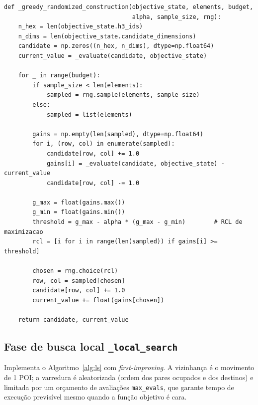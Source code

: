\documentclass[11pt,a4paper]{article}
\begin{document}
\begin{lstlisting}[style=py,caption={Construção gulosa-aleatória com RCL amostrada.}]
def _greedy_randomized_construction(objective_state, elements, budget,
                                    alpha, sample_size, rng):
    n_hex = len(objective_state.h3_ids)
    n_dims = len(objective_state.candidate_dimensions)
    candidate = np.zeros((n_hex, n_dims), dtype=np.float64)
    current_value = _evaluate(candidate, objective_state)

    for _ in range(budget):
        if sample_size < len(elements):
            sampled = rng.sample(elements, sample_size)
        else:
            sampled = list(elements)

        gains = np.empty(len(sampled), dtype=np.float64)
        for i, (row, col) in enumerate(sampled):
            candidate[row, col] += 1.0
            gains[i] = _evaluate(candidate, objective_state) - current_value
            candidate[row, col] -= 1.0

        g_max = float(gains.max())
        g_min = float(gains.min())
        threshold = g_max - alpha * (g_max - g_min)        # RCL de maximizacao
        rcl = [i for i in range(len(sampled)) if gains[i] >= threshold]

        chosen = rng.choice(rcl)
        row, col = sampled[chosen]
        candidate[row, col] += 1.0
        current_value += float(gains[chosen])

    return candidate, current_value
\end{lstlisting}

\subsection{Fase de busca local \texttt{\_local\_search}}

Implementa o Algoritmo~\ref{alg:ls} com \emph{first-improving}. A vizinhança é o
movimento de 1 POI; a varredura é aleatorizada (ordem dos pares ocupados e dos
destinos) e limitada por um orçamento de avaliações \texttt{max\_evals}, que
garante tempo de execução previsível mesmo quando a função objetivo é cara.
\end{document}
